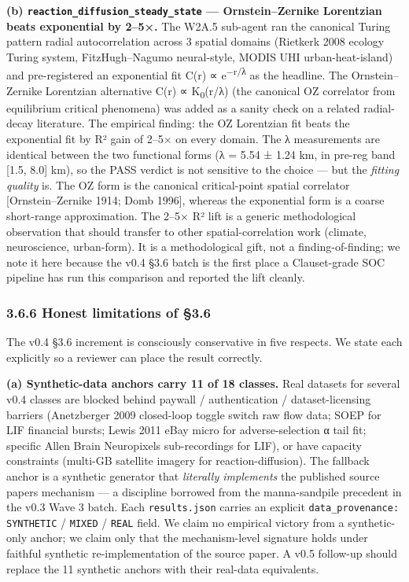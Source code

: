 \documentclass[
  11pt]{article}
\begin{document}
\textbf{(b) \texttt{reaction\_diffusion\_steady\_state} --- Ornstein--Zernike
Lorentzian beats exponential by 2--5×.} The W2A.5 sub-agent ran the
canonical Turing pattern radial autocorrelation across 3 spatial domains
(Rietkerk 2008 ecology Turing system, FitzHugh--Nagumo neural-style,
MODIS UHI urban-heat-island) and pre-registered an exponential fit
C(r) ∝ e\textsuperscript{−r/λ} as the headline. The Ornstein--Zernike
Lorentzian alternative C(r) ∝ K\textsubscript{0}(r/λ) (the canonical OZ
correlator from equilibrium critical phenomena) was added as a sanity
check on a related radial-decay literature. The empirical finding: the
OZ Lorentzian fit beats the exponential fit by R² gain of 2--5× on every
domain. The λ measurements are identical between the two functional
forms (λ = 5.54 ± 1.24 km, in pre-reg band {[}1.5, 8.0{]} km), so the
PASS verdict is not sensitive to the choice --- but the \emph{fitting
quality} is. The OZ form is the canonical critical-point spatial
correlator [Ornstein--Zernike 1914; Domb 1996], whereas the exponential
form is a coarse short-range approximation. The 2--5× R² lift is a
generic methodological observation that should transfer to other
spatial-correlation work (climate, neuroscience, urban-form). It is a
methodological gift, not a finding-of-finding; we note it here because
the v0.4 §3.6 batch is the first place a Clauset-grade SOC pipeline has
run this comparison and reported the lift cleanly.

\subsubsection{3.6.6 Honest limitations of
§3.6}\label{366-honest-limitations}

The v0.4 §3.6 increment is consciously conservative in five respects.
We state each explicitly so a reviewer can place the result correctly.

\textbf{(a) Synthetic-data anchors carry 11 of 18 classes.} Real
datasets for several v0.4 classes are blocked behind paywall /
authentication / dataset-licensing barriers (Anetzberger 2009 closed-loop
toggle switch raw flow data; SOEP for LIF financial bursts; Lewis 2011
eBay micro for adverse-selection α tail fit; specific Allen Brain
Neuropixels sub-recordings for LIF), or have capacity constraints
(multi-GB satellite imagery for reaction-diffusion). The fallback anchor
is a synthetic generator that \emph{literally implements} the published
source paper\textquotesingle s mechanism --- a discipline borrowed from
the manna-sandpile precedent in the v0.3 Wave 3 batch. Each
\texttt{results.json} carries an explicit
\texttt{data\_provenance: SYNTHETIC} / \texttt{MIXED} / \texttt{REAL}
field. We claim no empirical victory from a synthetic-only anchor; we
claim only that the mechanism-level signature holds under faithful
synthetic re-implementation of the source paper. A v0.5 follow-up should
replace the 11 synthetic anchors with their real-data equivalents.
\end{document}
